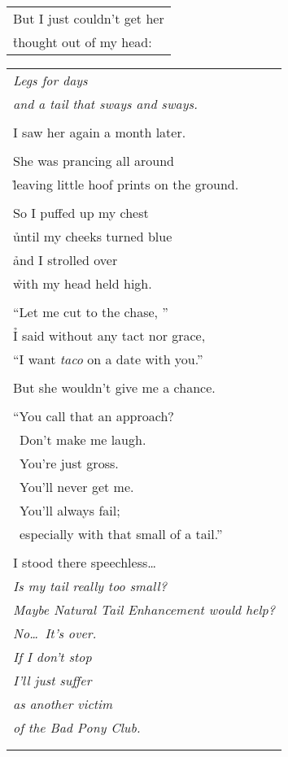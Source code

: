 \documentclass{article}
\begin{document}
\begin{center}
\begin{tabular}{l}
But I just couldn't get her \\
\h thought out of my head: \\
\end{tabular}
\begin{tabular}{l}
\\
\textit{Legs for days} \\
\h\textit{and a tail that sways and sways.} \\
\\
I saw her again a month later. \\
\\
She was prancing all around \\
\h leaving little hoof prints on the ground. \\
\\
So I puffed up my chest \\
\h until my cheeks turned blue \\
\h and I strolled over \\
\h with my head held high. \\
\\
``Let me cut to the chase, '' \\
\h I said without any tact nor grace, \\
``I want \textit{taco} on a date with you.'' \\
\\
But she wouldn't give me a chance. \\
\\
``You call that an approach? \\
\ Don't make me laugh. \\
\ You're just gross. \\
\ You'll never get me. \\
\ You'll always fail; \\
\ especially with that small of a tail.'' \\
\\
I stood there speechless\ldots \\
\h\textit{Is my tail really too small?} \\
\h\textit{Maybe Natural Tail Enhancement would help?} \\
\textit{No\ldots\ It's over.} \\
\textit{If I don't stop} \\
\h\textit{I'll just suffer} \\
\h\textit{as another victim} \\
\h\textit{of the Bad Pony Club.} \\
\\
\\
\end{tabular}
\end{center}
\end{document}
